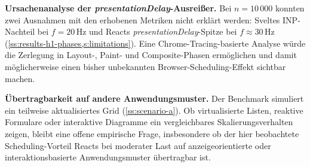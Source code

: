 \noindent\textbf{Ursachenanalyse der \textit{presentationDelay}-Ausreißer.} Bei $n = 10\,000$ konnten zwei Ausnahmen mit den erhobenen Metriken nicht erklärt werden: Sveltes INP-Nachteil bei $f = 20\,\text{Hz}$ und Reacts \textit{presentationDelay}-Spitze bei $f \approx 30\,\text{Hz}$ (\cref{ss:results-h1-phases,s:limitations}). Eine Chrome-Tracing-basierte Analyse würde die Zerlegung in Layout-, Paint- und Composite-Phasen ermöglichen und damit möglicherweise einen bisher unbekannten Browser-Scheduling-Effekt sichtbar machen.

\noindent\textbf{Übertragbarkeit auf andere Anwendungsmuster.} Der Benchmark simuliert ein teilweise aktualisiertes Grid (\cref{ss:scenario-a}). Ob virtualisierte Listen, reaktive Formulare oder interaktive Diagramme ein vergleichbares Skalierungsverhalten zeigen, bleibt eine offene empirische Frage, insbesondere ob der hier beobachtete Scheduling-Vorteil Reacts bei moderater Last auf anzeigeorientierte oder interaktionsbasierte Anwendungsmuster übertragbar ist.

